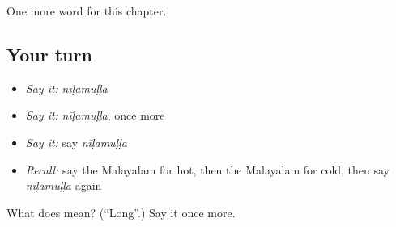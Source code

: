 \begin{grammarlens}[title={What you've built}]
One more word for this chapter.
\end{grammarlens}

\subsection*{Your turn}
\begin{itemize}
\raggedright
  \item \emph{Say it:} \emph{nīḷamuḷḷa}
  \item \emph{Say it:} \emph{nīḷamuḷḷa}, once more
  \item \emph{Say it:} say \emph{nīḷamuḷḷa}
  \item \emph{Recall:} say the Malayalam for hot, then the Malayalam for cold, then say \emph{nīḷamuḷḷa} again
\end{itemize}

\begin{tcolorbox}[breakable,colback=teal!4,colframe=teal!35!black,title={Before you move on}]
What does  mean? (\textquotedblleft{}Long\textquotedblright{}.) Say it once more.
\end{tcolorbox}

